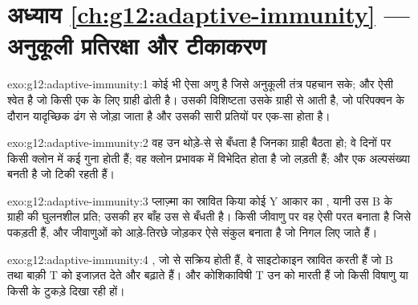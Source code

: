 \section*{अध्याय \ref{ch:g12:adaptive-immunity} --- अनुकूली प्रतिरक्षा और टीकाकरण}

\begin{solution}{exo:g12:adaptive-immunity:1}
 कोई भी ऐसा अणु है जिसे अनुकूली तंत्र पहचान सके; और  ऐसी श्वेत
 है जो किसी एक  के लिए ग्राही ढोती है। उसकी विशिष्टता उसके
ग्राही से आती है, जो परिपक्वन के दौरान यादृच्छिक ढंग से जोड़ा जाता है और
उसकी सारी प्रतियों पर एक-सा होता है।
\end{solution}

\begin{solution}{exo:g12:adaptive-immunity:2}
वह  उन थोड़े-से  से बँधता है जिनका ग्राही बैठता हो; वे
 दिनों पर किसी क्लोन में कई गुना होती हैं; वह क्लोन प्रभावक
 में विभेदित होता है जो लड़ती हैं; और एक अल्पसंख्या 
बनती है जो टिकी रहती हैं।
\end{solution}

\begin{solution}{exo:g12:adaptive-immunity:3}
प्लाज़्मा  का स्रावित किया कोई Y आकार का , यानी उस B 
के ग्राही की घुलनशील प्रति; उसकी हर बाँह उस  से बँधती है। किसी
जीवाणु पर वह ऐसी परत बनाता है जिसे  पकड़ती हैं, और जीवाणुओं को
आड़े-तिरछे जोड़कर ऐसे संकुल बनाता है जो निगल लिए जाते हैं।
\end{solution}

\begin{solution}{exo:g12:adaptive-immunity:4}
, जो  से सक्रिय होती हैं, वे साइटोकाइन
स्रावित करती हैं जो B  तथा बाक़ी T  को इजाज़त देते और बढ़ाते
हैं। और कोशिकाविषी T  उन  को मारती हैं जो किसी विषाणु या
किसी   के टुकड़े दिखा रही हों।
\end{solution}

